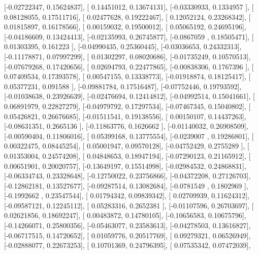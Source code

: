 \documentclass{article}
\begin{document}
       [-0.02722347,  0.15624837],
       [ 0.14451012,  0.13674131],
       [-0.03330933,  0.1334957 ],
       [ 0.08128055,  0.17511716],
       [ 0.02477628,  0.19222467],
       [ 0.12052124,  0.23268342],
       [ 0.01815897,  0.16178566],
       [ 0.00159032,  0.19500012],
       [ 0.05065192,  0.24695196],
       [-0.04186609,  0.13424413],
       [-0.02135993,  0.26745877],
       [-0.0867059 ,  0.18505471],
       [ 0.01303395,  0.161223  ],
       [-0.04990435,  0.25360445],
       [-0.03036653,  0.24332313],
       [-0.11178871,  0.07997299],
       [ 0.01302297,  0.08020686],
       [-0.01735249,  0.10570513],
       [-0.07679268,  0.17420656],
       [ 0.02694793,  0.22477865],
       [-0.00838306,  0.1767396 ],
       [ 0.07409534,  0.17393578],
       [ 0.00547155,  0.13338773],
       [-0.01918874,  0.18125417],
       [ 0.05377231,  0.091588  ],
       [-0.09881784,  0.17516487],
       [-0.07752446,  0.19793592],
       [-0.01038638,  0.23926639],
       [-0.02476694,  0.12414812],
       [-0.04992514,  0.15041661],
       [ 0.06891979,  0.22827279],
       [-0.04979792,  0.17297534],
       [-0.07467345,  0.15040802],
       [ 0.05426821,  0.26676685],
       [-0.01511541,  0.19138556],
       [ 0.00150107,  0.14437263],
       [-0.08631351,  0.2665136 ],
       [-0.11863776,  0.1626662 ],
       [-0.01140032,  0.26908509],
       [-0.00590404,  0.11806016],
       [ 0.05399168,  0.13775554],
       [-0.0239007 ,  0.19286801],
       [ 0.00322475,  0.08445254],
       [ 0.05001947,  0.09570128],
       [-0.04752429,  0.2755289 ],
       [ 0.01353004,  0.24574208],
       [ 0.04848653,  0.18947194],
       [-0.07290123,  0.21165912],
       [ 0.00651901,  0.20020757],
       [-0.13649197,  0.15514998],
       [-0.02984532,  0.24868831],
       [-0.06334743,  0.23328648],
       [-0.12750022,  0.23756866],
       [-0.04372208,  0.27126703],
       [-0.12862181,  0.13527677],
       [-0.09287514,  0.13082684],
       [-0.0781549 ,  0.1802969 ],
       [-0.1992662 ,  0.23547544],
       [ 0.01794342,  0.09839342],
       [ 0.02709939,  0.11624312],
       [-0.09587121,  0.12245112],
       [ 0.05283316,  0.2652381 ],
       [-0.01107596,  0.26703697],
       [ 0.02621856,  0.18692247],
       [ 0.00483872,  0.14780105],
       [-0.10656583,  0.10675796],
       [-0.14266071,  0.25800356],
       [-0.05463077,  0.23583613],
       [-0.04278503,  0.13616827],
       [-0.06717515,  0.14720652],
       [ 0.01059776,  0.20517769],
       [ 0.09279321,  0.06526949],
       [-0.02888077,  0.22673253],
       [ 0.10701369,  0.24796395],
       [ 0.07535342,  0.07472039],
\end{document}
